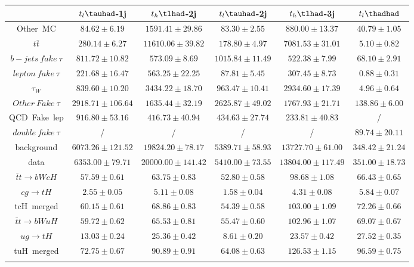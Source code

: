 \centering
\begin{tabular}{cccccc} \toprule\toprule
 & $t_{l}\tauhad$-1j & $t_{h}\tlhad$-2j & $t_{l}\tauhad$-2j & $t_{h}\tlhad$-3j & $t_{l}\thadhad$\\\midrule
Other~MC & $84.62\pm6.19$ & $1591.41\pm29.86$ & $83.30\pm2.55$ & $880.00\pm13.37$ & $40.79\pm1.05$\\
$t\bar{t}$ & $280.14\pm6.27$ & $11610.06\pm39.82$ & $178.80\pm4.97$ & $7081.53\pm31.01$ & $5.10\pm0.82$\\
$b-jets~fake~\tau$ & $811.72\pm10.82$ & $573.09\pm8.69$ & $1015.84\pm11.49$ & $522.38\pm7.99$ & $68.10\pm2.91$\\
$lepton~fake~\tau$ & $221.68\pm16.47$ & $563.25\pm22.25$ & $87.81\pm5.45$ & $307.45\pm8.73$ & $0.88\pm0.31$\\
$\tau_{W}$ & $839.60\pm10.20$ & $3434.22\pm18.70$ & $963.47\pm10.41$ & $2934.60\pm17.39$ & $4.96\pm0.64$\\
$Other~Fake~\tau$ & $2918.71\pm106.64$ & $1635.44\pm32.19$ & $2625.87\pm49.02$ & $1767.93\pm21.71$ & $138.86\pm6.00$\\
QCD~Fake~lep & $916.80\pm53.16$ & $416.73\pm40.94$ & $434.63\pm27.74$ & $233.81\pm40.83$ &  /\\
$double~fake~\tau$ &  / &  / &  / &  / & $89.74\pm20.11$\\
background & $6073.26\pm121.52$ & $19824.20\pm78.17$ & $5389.71\pm58.93$ & $13727.70\pm61.00$ & $348.42\pm21.24$\\
data & $6353.00\pm79.71$ & $20000.00\pm141.42$ & $5410.00\pm73.55$ & $13804.00\pm117.49$ & $351.00\pm18.73$\\
$\bar{t}t\to bWcH$ & $57.59\pm0.61$ & $63.75\pm0.83$ & $52.80\pm0.58$ & $98.68\pm1.08$ & $66.43\pm0.65$\\
$cg\to tH$ & $2.55\pm0.05$ & $5.11\pm0.08$ & $1.58\pm0.04$ & $4.31\pm0.08$ & $5.84\pm0.07$\\
tcH~merged & $60.15\pm0.61$ & $68.86\pm0.83$ & $54.39\pm0.58$ & $103.00\pm1.09$ & $72.26\pm0.66$\\
$\bar{t}t\to bWuH$ & $59.72\pm0.62$ & $65.53\pm0.81$ & $55.47\pm0.60$ & $102.96\pm1.07$ & $69.07\pm0.67$\\
$ug\to tH$ & $13.03\pm0.24$ & $25.36\pm0.42$ & $8.61\pm0.20$ & $23.57\pm0.42$ & $27.52\pm0.35$\\
tuH~merged & $72.75\pm0.67$ & $90.89\pm0.91$ & $64.08\pm0.63$ & $126.53\pm1.15$ & $96.59\pm0.75$\\
\bottomrule\bottomrule\\
\end{tabular}
